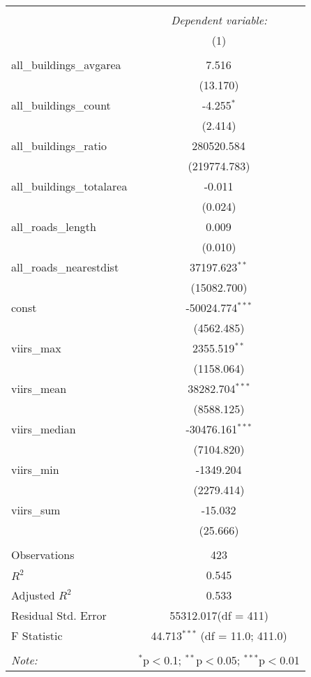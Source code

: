 \begin{table}[!htbp] \centering
\begin{tabular}{@{\extracolsep{5pt}}lc}
\\[-1.8ex]\hline
\hline \\[-1.8ex]
& \multicolumn{1}{c}{\textit{Dependent variable:}} \
\cr \cline{1-2}
\\[-1.8ex] & (1) \\
\hline \\[-1.8ex]
 all_buildings_avgarea & 7.516$^{}$ \\
  & (13.170) \\
 all_buildings_count & -4.255$^{*}$ \\
  & (2.414) \\
 all_buildings_ratio & 280520.584$^{}$ \\
  & (219774.783) \\
 all_buildings_totalarea & -0.011$^{}$ \\
  & (0.024) \\
 all_roads_length & 0.009$^{}$ \\
  & (0.010) \\
 all_roads_nearestdist & 37197.623$^{**}$ \\
  & (15082.700) \\
 const & -50024.774$^{***}$ \\
  & (4562.485) \\
 viirs_max & 2355.519$^{**}$ \\
  & (1158.064) \\
 viirs_mean & 38282.704$^{***}$ \\
  & (8588.125) \\
 viirs_median & -30476.161$^{***}$ \\
  & (7104.820) \\
 viirs_min & -1349.204$^{}$ \\
  & (2279.414) \\
 viirs_sum & -15.032$^{}$ \\
  & (25.666) \\
\hline \\[-1.8ex]
 Observations & 423 \\
 $R^2$ & 0.545 \\
 Adjusted $R^2$ & 0.533 \\
 Residual Std. Error & 55312.017(df = 411)  \\
 F Statistic & 44.713$^{***}$ (df = 11.0; 411.0) \\
\hline
\hline \\[-1.8ex]
\textit{Note:} & \multicolumn{1}{r}{$^{*}$p$<$0.1; $^{**}$p$<$0.05; $^{***}$p$<$0.01} \\
\end{tabular}
\end{table}